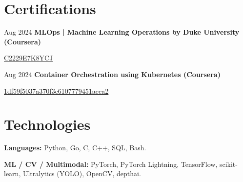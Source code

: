     \section{Certifications}

        \begin{samepage}
            \begin{twocolentry}{
                Aug 2024
            }
                \textbf{MLOps | Machine Learning Operations by Duke University (Coursera)}
            \end{twocolentry}
            \vspace{0.06 cm}
            \begin{onecolentry}
                \href{https://coursera.org/verify/specialization/C2229E7K8YCJ}{C2229E7K8YCJ}
            \end{onecolentry}
        \end{samepage}

        \vspace{0.05 cm}
        \begin{samepage}
            \begin{twocolentry}{
                Aug 2024
            }
                \textbf{Container Orchestration using Kubernetes (Coursera)}
            \end{twocolentry}
            \vspace{0.06 cm}
            \begin{onecolentry}
                \href{https://coursera.org/share/1df59f5037a370f3e6107779451aeca2}{1df59f5037a370f3e6107779451aeca2}
            \end{onecolentry}
        \end{samepage}

    \section{Technologies}

        \begin{onecolentry}
            \textbf{Languages:} Python, Go, C, C++, SQL, Bash.
        \end{onecolentry}
        \vspace{0.05 cm}

        \begin{onecolentry}
            \textbf{ML / CV / Multimodal:} PyTorch, PyTorch Lightning, TensorFlow, scikit-learn, Ultralytics (YOLO), OpenCV, depthai.
        \end{onecolentry}
        \vspace{0.05 cm}

